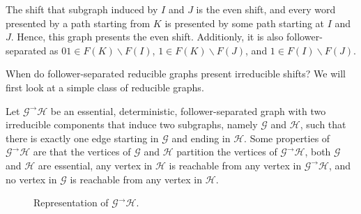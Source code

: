 \documentclass[hidelinks]{article}
\newcommand{\Lc}{\mathcal{L}}  %
\newcommand{\Gc}{\mathcal{G}}  %
\newcommand{\Hc}{\mathcal{H}}  %
\newcommand{\Vc}{\mathcal{V}}
\newcommand{\GtH}{{\Gc^\to\Hc}}
\newcommand{\shift}[1]{\mathsf{X}_{#1}}
\theoremstyle{definition}
\begin{document}
\noindent The shift that subgraph induced by \(I\) and \(J\) is the even shift, and every 
word presented by a path starting from \(K\) is presented by some path starting at 
\(I\) and \(J\). Hence, this graph presents the even shift. Additionly, it is 
also follower-separated as \(01 \in F(K)\backslash F(I)\), \(1 \in F(K)\backslash F(J)\),
and \(1 \in F(I) \backslash F(J)\). 

When do follower-separated reducible graphs present irreducible shifts? We will first look 
at a simple class of reducible graphs.

Let \(\GtH\) be an essential, deterministic, follower-separated graph with two irreducible components
that induce two subgraphs, namely \(\Gc\) and \(\Hc\), such that there is 
exactly one edge starting in \(\Gc\) and ending in \(\Hc\). 
Some properties of \(\GtH\) are that the vertices of \(\Gc\) and \(\Hc\)
partition the vertices of \(\GtH\), both \(\Gc\) and \(\Hc\) are essential,  
any vertex in \(\Hc\) is reachable from any vertex in \(\GtH\), and no vertex in \(\Gc\) 
is reachable from any vertex in \(\Hc\).



\begin{figure}[h]
    \centering
    \caption{Representation of \(\GtH\).}
\end{figure}
\end{document}
